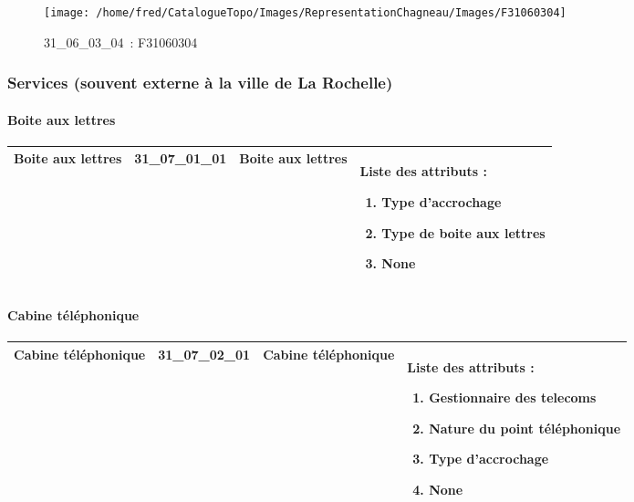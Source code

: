 \documentclass[12pt,titlepage,oneside]{book}
\begin{document}
\begin{figure}[h!]
  \hfill         %
  \begin{minipage}[t]{3cm}
    \begin{center}
      \texttt{[image: /home/fred/CatalogueTopo/Images/RepresentationChagneau/Images/F31060304]}
      \caption[~31\_06\_03\_04]{\small{31\_06\_03\_04~:} \tiny{F31060304}}\label{F31060304}
    \end{center}
  \end{minipage}
\end{figure}

\subsubsection{\large Services (souvent externe à la ville de La Rochelle)}
\paragraph{Boite aux lettres}
\noindent
\vspace{\baselineskip}

\renewcommand{\arraystretch}{1.2}
\begin{supertabular}{|p{10cm}|c|p{13cm}|p{12cm}|}
 Boite aux lettres & 31\_07\_01\_01 & Boite aux lettres & Liste des attributs :
\begin{enumerate}
  \item Type d'accrochage  \item Type de boite aux lettres  \item None\end{enumerate}
\\
\hline
\end{supertabular}
\begin{figure}[h!]
  \hfill         %
\end{figure}


\paragraph{Cabine téléphonique}
\noindent
\vspace{\baselineskip}

\renewcommand{\arraystretch}{1.2}
\begin{supertabular}{|p{10cm}|c|p{13cm}|p{12cm}|}
 Cabine téléphonique & 31\_07\_02\_01 & Cabine téléphonique & Liste des attributs :
\begin{enumerate}
  \item Gestionnaire des telecoms  \item Nature du point téléphonique  \item Type d'accrochage  \item None\end{enumerate}
\\
\hline
\end{supertabular}
\begin{figure}[h!]
  \hfill         %
\end{figure}
\end{document}
